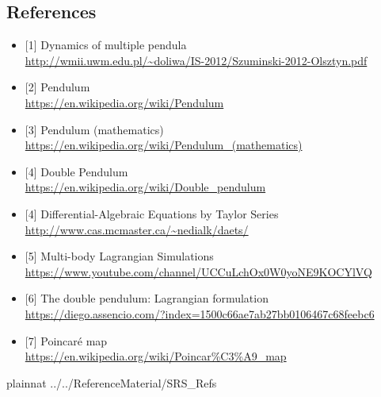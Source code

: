 \documentclass[12pt]{article}
\begin{document}
\subsection*{References}\label{ssec:ref}
\begin{itemize}
\item{[1]} Dynamics of multiple pendula \\\url{http://wmii.uwm.edu.pl/~doliwa/IS-2012/Szuminski-2012-Olsztyn.pdf}
\item{[2]} Pendulum \\\url{https://en.wikipedia.org/wiki/Pendulum}
\item{[3]} Pendulum (mathematics)
\\\url{https://en.wikipedia.org/wiki/Pendulum_(mathematics)}
\item{[4]} Double Pendulum
\\\url{https://en.wikipedia.org/wiki/Double_pendulum}\item{[4]}
Differential-Algebraic Equations by Taylor Series
\\\url{http://www.cas.mcmaster.ca/~nedialk/daets/}
\item{[5]} Multi-body Lagrangian Simulations
\\\url{https://www.youtube.com/channel/UCCuLchOx0W0yoNE9KOCYlVQ}
\item{[6]} The double pendulum: Lagrangian formulation
\\\url{https://diego.assencio.com/?index=1500c66ae7ab27bb0106467c68feebc6}
\item{[7]} Poincaré map
\\\url{https://en.wikipedia.org/wiki/Poincar%C3%A9_map}
\end{itemize}

 {plainnat}
 {../../ReferenceMaterial/SRS_Refs}
\end{document}

